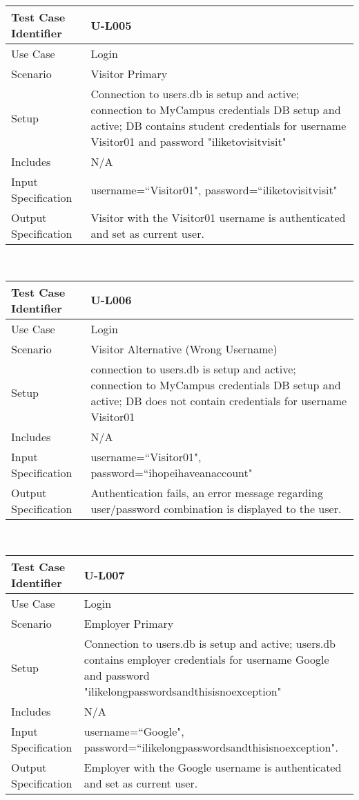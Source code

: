 \documentclass{l3deliverable}
\begin{document}
\begin{tabular}{lp{10cm}}
\hline 
\textbf{Test Case Identifier} & U-L005\tabularnewline
\hline 
\hline 
Use Case & Login \tabularnewline
\hline 
Scenario & Visitor Primary \tabularnewline
\hline 
Setup &  Connection to users.db is setup and active; connection to MyCampus credentials DB setup and active; DB contains student credentials for username Visitor01 and password "iliketovisitvisit" \tabularnewline
\hline 
Includes &  N/A \tabularnewline
\hline 
Input Specification & username=``Visitor01", password=``iliketovisitvisit"\tabularnewline
\hline 
Output Specification &  Visitor with the Visitor01 username is authenticated and set as current user.\tabularnewline
\hline 
\end{tabular}\\


\begin{tabular}{lp{10cm}}
\hline 
\textbf{Test Case Identifier} & U-L006 \tabularnewline
\hline 
\hline 
Use Case & Login \tabularnewline
\hline 
Scenario & Visitor Alternative (Wrong Username) \tabularnewline
\hline 
Setup & connection to users.db is setup and active; connection to MyCampus credentials DB setup and active; DB does not contain credentials for username Visitor01 \tabularnewline
\hline 
Includes & N/A \tabularnewline
\hline 
Input Specification & username=``Visitor01", password=``ihopeihaveanaccount"  \tabularnewline
\hline 
Output Specification & Authentication fails, an error message regarding user/password combination is displayed to the user.\tabularnewline
\hline 
\end{tabular}\\


\begin{tabular}{lp{10cm}}
\hline 
\textbf{Test Case Identifier} & U-L007\tabularnewline
\hline 
\hline 
Use Case & Login \tabularnewline
\hline 
Scenario & Employer Primary \tabularnewline
\hline 
Setup & Connection to users.db is setup and active; users.db contains employer credentials for username Google and password "ilikelongpasswordsandthisisnoexception" \tabularnewline
\hline 
Includes & N/A \tabularnewline
\hline 
Input Specification & username=``Google", password=``ilikelongpasswordsandthisisnoexception".\tabularnewline
\hline 
Output Specification & Employer with the Google username is authenticated and set as current user.\tabularnewline
\hline 
\end{tabular}\\
\end{document}

